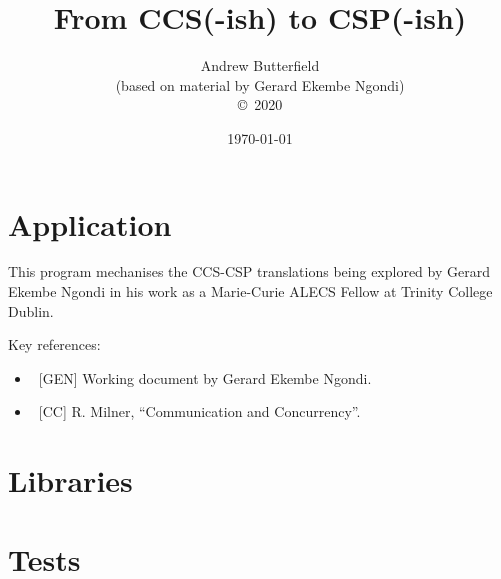 \documentclass[fleqn,10pt]{report}
\author{
Andrew Butterfield
\\(based on material by Gerard Ekembe Ngondi)
\\
{\small \copyright\ 2020}
}
\title{
  From CCS(-ish) to CSP(-ish)
}
\date{
\today
}
\begin{document}
\maketitle
\tableofcontents


\chapter{Application}

This program mechanises the CCS-CSP translations
being explored by Gerard Ekembe Ngondi
in his work as a Marie-Curie ALECS Fellow at Trinity College Dublin.

Key references:
\begin{itemize}
  \item ~[GEN] Working document by Gerard Ekembe Ngondi.
  \item ~[CC] R. Milner, ``Communication and Concurrency''.
\end{itemize}

\newpage


\chapter{Libraries}

\newpage

\newpage

\newpage


\appendix


\chapter{Tests}

\newpage


% 



\end{document}

